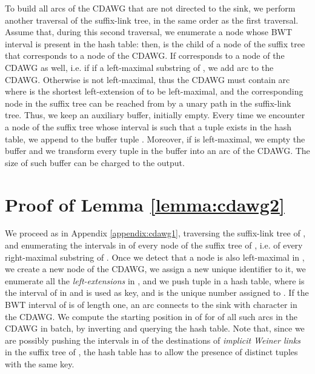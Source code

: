 \documentclass[a4paper,UKenglish]{lipics-v2016}
\begin{document}
To build all arcs of the CDAWG that are not directed to the sink, we perform another traversal of the suffix-link tree, in the same order as the first traversal. Assume that, during this second traversal, we enumerate a node  whose BWT interval is present in the hash table: then,  is the child of a node  of the suffix tree that corresponds to a node  of the CDAWG. If  corresponds to a node  of the CDAWG as well, i.e. if  if a left-maximal substring of , we add arc  to the CDAWG. Otherwise  is not left-maximal, thus the CDAWG must contain arc  where  is the shortest left-extension of  to be left-maximal, and the corresponding node  in the suffix tree can be reached from  by a unary path in the suffix-link tree. Thus, we keep an auxiliary buffer, initially empty. Every time we encounter a node  of the suffix tree whose interval  is such that a tuple  exists in the hash table, we append to the buffer tuple . Moreover, if  is left-maximal, we empty the buffer and we transform every tuple  in the buffer into an arc  of the CDAWG. The size of such buffer can be charged to the output.





\section{Proof of Lemma \ref{lemma:cdawg2}} \label{appendix:cdawg2}

We proceed as in Appendix \ref{appendix:cdawg1}, traversing the suffix-link tree of , and enumerating the intervals in  of every node of the suffix tree of , i.e. of every right-maximal substring of . Once we detect that a node  is also left-maximal in , we create a new node  of the CDAWG, we assign a new unique identifier to it, we enumerate all the \emph{left-extensions}  in , and we push tuple  in a hash table, where  is the interval of  in  and is used as key, and  is the unique number assigned to . If the BWT interval of  is of length one, an arc connects  to the sink  with character  in the CDAWG. We compute the starting position in  of  for of all such arcs  in the CDAWG in batch, by inverting  and querying the hash table. Note that, since we are possibly pushing the intervals in  of the destinations of \emph{implicit Weiner links} in the suffix tree of , the hash table has to allow the presence of distinct tuples with the same key.
\end{document}
